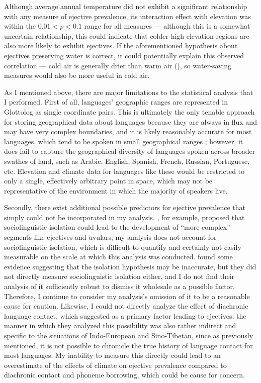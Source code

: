 \documentclass{article}
\begin{document}
Although average annual temperature did not exhibit a significant relationship with any measure of ejective prevalence, its interaction effect with elevation was within the $0.01 < p < 0.1$ range for all measures --- although this is a somewhat uncertain relationship, this could indicate that colder high-elevation regions are also more likely to exhibit ejectives. If the aforementioned hypothesis about ejectives preserving water is correct, it could potentially explain this observed correlation --- cold air is generally drier than warm air (\cite{koskela2007}), so water-saving measures would also be more useful in cold air.

As I mentioned above, there are major limitations to the statistical analysis that I performed. First of all, languages' geographic ranges are represented in Glottolog as single coordinate pairs. This is ultimately the only tenable approach for storing geographical data about languages because they are always in flux and may have very complex boundaries, and it is likely reasonably accurate for most languages, which tend to be spoken in small geographical ranges \parencite{hua2019}; however, it does fail to capture the geographical diversity of languages spoken across broader swathes of land, such as Arabic, English, Spanish, French, Russian, Portuguese, etc. Elevation and climate data for languages like these would be restricted to only a single, effectively arbitrary point in space, which may not be representative of the environment in which the majority of speakers live. 

Secondly, there exist additional possible predictors for ejective prevalence that simply could not be incorporated in my analysis. \textcite{nichols2014}, for example, proposed that sociolinguistic isolation could lead to the development of ``more complex'' segments like ejectives and uvulars; my analysis does not account for sociolinguistic isolation, which is difficult to quantify and certainly not easily measurable on the scale at which this analysis was conducted. \textcite{urban2021} found some evidence suggesting that the isolation hypothesis may be inaccurate, but they did not directly measure sociolinguistic isolation either, and I do not find their analysis of it sufficiently robust to dismiss it wholesale as a possible factor. Therefore, I continue to consider my analysis's omission of it to be a reasonable cause for caution. Likewise, I could not directly analyze the effect of diachronic language contact, which \textcite{urban2021} suggested as a primary factor leading to ejectives; the manner in which they analyzed this possibility was also rather indirect and specific to the situations of Indo-European and Sino-Tibetan, since as previously mentioned, it is not possible to chronicle the true history of language contact for most languages. My inability to measure this directly could lead to an overestimate of the effects of climate on ejective prevalence compared to diachronic contact and phoneme borrowing, which could be cause for concern. 
\end{document}
